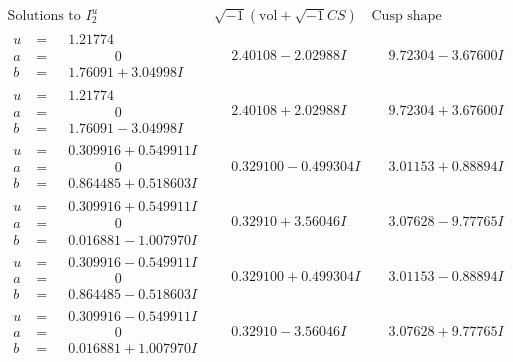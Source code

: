 \documentclass[1p]{elsarticle_modified}
\theoremstyle{definition}
\newcommand{\I}{\sqrt{-1}}
\begin{document}
$$\begin{array}{c|c|c}  
\text{Solutions to }I^u_{2}& \I (\text{vol} + \sqrt{-1}CS) & \text{Cusp shape}\\
 \hline 
\begin{aligned}
u &= \phantom{-}1.21774\phantom{ +0.000000I} \\
a &= \phantom{-0.000000 } 0 \\
b &= \phantom{-}1.76091 + 3.04998 I\end{aligned}
 & \phantom{-}2.40108 - 2.02988 I & \phantom{-}9.72304 - 3.67600 I \\ \hline\begin{aligned}
u &= \phantom{-}1.21774\phantom{ +0.000000I} \\
a &= \phantom{-0.000000 } 0 \\
b &= \phantom{-}1.76091 - 3.04998 I\end{aligned}
 & \phantom{-}2.40108 + 2.02988 I & \phantom{-}9.72304 + 3.67600 I \\ \hline\begin{aligned}
u &= \phantom{-}0.309916 + 0.549911 I \\
a &= \phantom{-0.000000 } 0 \\
b &= \phantom{-}0.864485 + 0.518603 I\end{aligned}
 & \phantom{-}0.329100 - 0.499304 I & \phantom{-}3.01153 + 0.88894 I \\ \hline\begin{aligned}
u &= \phantom{-}0.309916 + 0.549911 I \\
a &= \phantom{-0.000000 } 0 \\
b &= \phantom{-}0.016881 - 1.007970 I\end{aligned}
 & \phantom{-}0.32910 + 3.56046 I & \phantom{-}3.07628 - 9.77765 I \\ \hline\begin{aligned}
u &= \phantom{-}0.309916 - 0.549911 I \\
a &= \phantom{-0.000000 } 0 \\
b &= \phantom{-}0.864485 - 0.518603 I\end{aligned}
 & \phantom{-}0.329100 + 0.499304 I & \phantom{-}3.01153 - 0.88894 I \\ \hline\begin{aligned}
u &= \phantom{-}0.309916 - 0.549911 I \\
a &= \phantom{-0.000000 } 0 \\
b &= \phantom{-}0.016881 + 1.007970 I\end{aligned}
 & \phantom{-}0.32910 - 3.56046 I & \phantom{-}3.07628 + 9.77765 I \\ \hline\begin{aligned}

\end{aligned}
\end{array}$$
\end{document}
